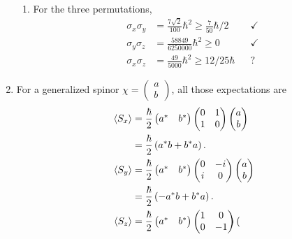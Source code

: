 \documentclass{homework}
\begin{document}
\begin{enumerate}
\begin{enumerate}
			\item For the three permutations, \begin{align*}
				\sigma_x \sigma_y & = \frac{7 \sqrt{2}}{100}\hbar^2 \ge \frac{7}{50}\hbar / 2 && \checkmark \\
				\sigma_y \sigma_z & = \frac{58849}{6250000}\hbar^2 \ge  0 && \checkmark \\
				\sigma_x \sigma_z & = \frac{49}{5000} \hbar^2 \ge 12/25\hbar &&  ?
			\end{align*}
			\end{enumerate}
		\item %
			For a generalized spinor $\chi = \begin{pmatrix}
				a \\ b
			\end{pmatrix}$, all those expectations are \begin{align*}
				\expval{S_x} & = \frac{\hbar}{2} \begin{pmatrix}
					a^* & b^*
				\end{pmatrix} \begin{pmatrix}
					0 & 1 \\
					1 & 0
				\end{pmatrix} \begin{pmatrix}
				a \\ b
			\end{pmatrix} \\
			& = \frac{\hbar}{2} \left(a^* b + b^* a\right). \\
			\expval{S_y} & = \frac{\hbar}{2} \begin{pmatrix}
					a^* & b^*
				\end{pmatrix} \begin{pmatrix}
					0 & -i \\
					i & 0 
				\end{pmatrix} \begin{pmatrix}
						a \\ b
				\end{pmatrix} \\
			& = \frac{\hbar}{2} \left(-a^* b + b^* a\right). \\
		\expval{S_z} & = \frac{\hbar}{2} \begin{pmatrix}
			a^* & b^*
		\end{pmatrix} \begin{pmatrix}
				1 & 0 \\
				0 & -1 
			\end{pmatrix} \begin{pmatrix}

\end{pmatrix}
\end{align*}
\end{enumerate}
\end{document}
